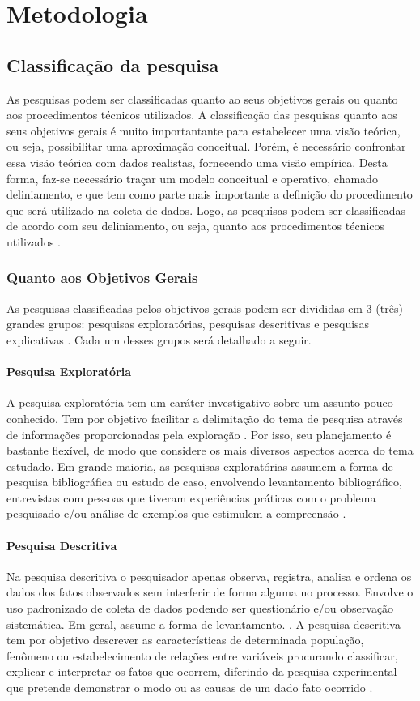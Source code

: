 \chapter{Metodologia}
\section{Classificação da pesquisa}

As pesquisas podem ser classificadas quanto ao seus objetivos gerais ou quanto aos procedimentos técnicos utilizados. A classificação das pesquisas quanto aos seus objetivos gerais é muito importantante para estabelecer uma visão teórica, ou seja, possibilitar uma aproximação conceitual. Porém, é necessário confrontar essa visão teórica com dados realistas, fornecendo uma visão empírica. Desta forma, faz-se necessário traçar um modelo conceitual e operativo, chamado deliniamento, e que tem como parte mais importante a definição do procedimento que será utilizado na coleta de dados. Logo, as pesquisas podem ser classificadas de acordo com seu deliniamento, ou seja, quanto aos procedimentos técnicos utilizados \cite{ac2002elaborar}.

\subsection{Quanto aos Objetivos Gerais}
As pesquisas classificadas pelos objetivos gerais podem ser divididas em 3 (três) grandes grupos: pesquisas exploratórias, pesquisas descritivas e pesquisas explicativas \cite{ac2002elaborar}. Cada um desses grupos será detalhado a seguir. 
\subsubsection{Pesquisa Exploratória}
A pesquisa exploratória tem um caráter investigativo sobre um assunto pouco conhecido. Tem por objetivo facilitar a delimitação do tema de pesquisa através de informações proporcionadas pela exploração \cite{prodanov2013metodologia}. Por isso, seu planejamento é bastante flexível, de modo que considere os mais diversos aspectos acerca do tema estudado. Em grande maioria, as pesquisas exploratórias assumem a forma de pesquisa bibliográfica ou estudo de caso, envolvendo levantamento bibliográfico, entrevistas com pessoas que tiveram experiências práticas com o problema pesquisado e/ou análise de exemplos que estimulem a compreensão \cite{ac2002elaborar}.
\subsubsection{Pesquisa Descritiva}
Na pesquisa descritiva o pesquisador apenas observa, registra, analisa e ordena os dados dos fatos observados sem interferir de forma alguma no processo. Envolve o uso padronizado de coleta de dados podendo ser questionário e/ou observação sistemática. Em geral, assume a forma de levantamento. \cite{ac2002elaborar}. 
A pesquisa descritiva tem por objetivo descrever as características de determinada população, fenômeno ou estabelecimento de relações entre variáveis procurando classificar, explicar e interpretar os fatos que ocorrem, diferindo da pesquisa experimental que pretende demonstrar o modo ou as causas de um dado fato ocorrido \cite{prodanov2013metodologia}.
